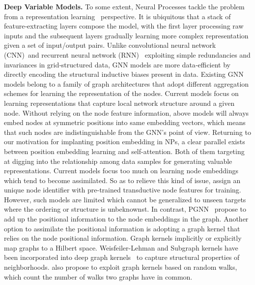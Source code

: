 \documentclass[sigconf]{acmart} %
\begin{document}
\noindent\textbf{Deep Variable Models.}
To some extent, Neural Processes tackle the problem from a representation learning~\cite{bengio2013representation}
perspective. It is ubiquitous that a stack of feature‐extracting layers compose the model, with the first layer processing raw inputs and the subsequent layers gradually learning more complex representation given a set of input/output pairs.
Unlike convolutional neural network (CNN)~\cite{lecun1989backpropagation,krizhevsky2012imagenet}and recurrent neural network (RNN)~\cite{hochreiter1997long,elman1990finding} exploiting simple redundancies and invariances in grid‐structured data, GNN models are more data‐efficient by directly encoding the structural inductive biases present in data. 
Existing GNN models belong to a family of graph architectures that adopt different aggregation schemes for learning the representation of the nodes.
Current models focus on learning representations that capture local network structure around a given node. Without relying on the node feature information, above models will always embed nodes at symmetric positions into same embedding vectors, which means that such nodes are indistinguishable from the GNN’s point of view.
Returning to our motivation for implanting position embedding in NPs, a clear parallel exists between position embedding learning and self-attention. Both of them targeting at digging into the relationship among data samples for generating valuable representations. Current models focus too much on learning node embeddings which tend to become assimilated.
So as to relieve this kind of issue, \cite{kipf2016semi,hamilton2017inductive} assign an unique node identifier with pre-trained transductive node features for training. 
However, such models are limited which cannot be generalized to unseen targets where the ordering or structure is unbeknownst. In contrast, PGNN~\cite{you2019position} propose to add up the positional information to the node embeddings in the graph.
Another option to assimilate the positional information is adopting a graph kernel that relies on the node positional information. Graph kernels implicitly or explicitly map graphs to a Hilbert space. Weisfeiler-Lehman and Subgraph kernels
have been incorporated into deep graph kernels~\cite{yanardag2015deep} to capture structural properties of neighborhoods. \cite{kashima2003marginalized,gartner2003graph} also propose to exploit graph kernels based on random walks, which count the number of walks two graphs have in common.
\end{document}
